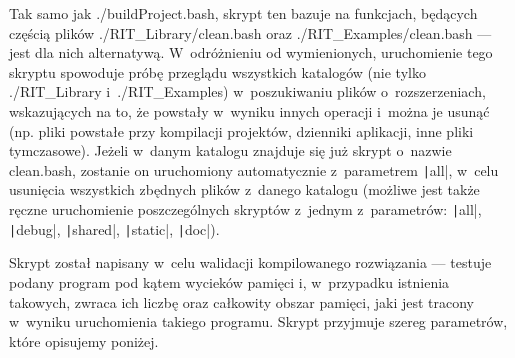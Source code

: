 Tak samo jak \textsf{./buildProject.bash}, skrypt ten bazuje na funkcjach, będących częścią plików \textsf{./RIT\_Library/clean.bash} oraz \textsf{./RIT\_Examples/clean.bash} --- jest dla nich alternatywą. W~odróżnieniu od wymienionych, uruchomienie tego skryptu spowoduje próbę przeglądu wszystkich katalogów (nie tylko \textsf{./RIT\_Library} i~\textsf{./RIT\_Examples}) w~poszukiwaniu plików o~rozszerzeniach, wskazujących na to, że powstały w~wyniku innych operacji i~można je usunąć (np. pliki powstałe przy kompilacji projektów, dzienniki aplikacji, inne pliki tymczasowe). Jeżeli w~danym katalogu znajduje się już skrypt o~nazwie \textsf{clean.bash}, zostanie on uruchomiony automatycznie z~parametrem \texttt|all|, w~celu usunięcia wszystkich zbędnych plików z~danego katalogu (możliwe jest także ręczne uruchomienie poszczególnych skryptów z~jednym z~parametrów: \texttt|all|, \texttt|debug|, \texttt|shared|, \texttt|static|, \texttt|doc|).

Skrypt został napisany w~celu walidacji kompilowanego rozwiązania --- testuje podany program pod kątem wycieków pamięci i, w~przypadku istnienia takowych, zwraca ich liczbę oraz całkowity obszar pamięci, jaki jest tracony w~wyniku uruchomienia takiego programu. Skrypt przyjmuje szereg parametrów, które opisujemy poniżej.

